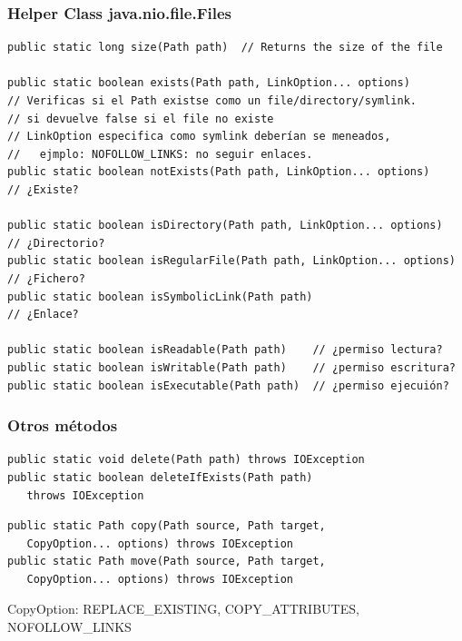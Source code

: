 \documentclass{beamer}
\begin{document}
\begin{frame}[fragile]
\frametitle{Helper Class java.nio.file.Files}
\begin{tiny}
\begin{verbatim}
public static long size(Path path)  // Returns the size of the file
 
public static boolean exists(Path path, LinkOption... options)
// Verificas si el Path existse como un file/directory/symlink.
// si devuelve false si el file no existe
// LinkOption especifica como symlink deberían se meneados, 
//   ejmplo: NOFOLLOW_LINKS: no seguir enlaces.
public static boolean notExists(Path path, LinkOption... options)     // ¿Existe?
 
public static boolean isDirectory(Path path, LinkOption... options)   // ¿Directorio?
public static boolean isRegularFile(Path path, LinkOption... options) // ¿Fichero?
public static boolean isSymbolicLink(Path path)                       // ¿Enlace?
 
public static boolean isReadable(Path path)    // ¿permiso lectura?
public static boolean isWritable(Path path)    // ¿permiso escritura?
public static boolean isExecutable(Path path)  // ¿permiso ejecuión?
\end{verbatim}
\end{tiny}
\end{frame}

\begin{frame}[fragile]
\frametitle{Otros métodos}
\begin{verbatim}
public static void delete(Path path) throws IOException
public static boolean deleteIfExists(Path path)
   throws IOException
\end{verbatim}
\pause
\begin{verbatim}
public static Path copy(Path source, Path target, 
   CopyOption... options) throws IOException
public static Path move(Path source, Path target, 
   CopyOption... options) throws IOException
\end{verbatim}
CopyOption: REPLACE\_EXISTING, COPY\_ATTRIBUTES, NOFOLLOW\_LINKS
\pause
\end{frame}
\end{document}
